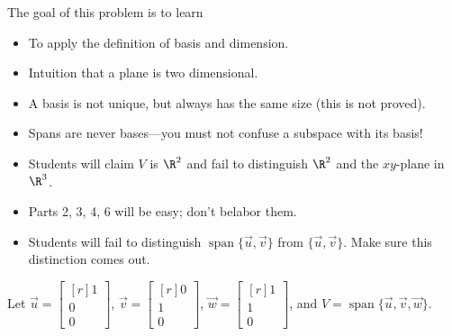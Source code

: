 \documentclass{problemset}
\DeclareMathOperator{\Span}{span}
\newcommand{\mat}[1]{\begin{bmatrix*}[r]#1\end{bmatrix*}}
\begin{document}
	\question
	\begin{annotation}
		\begin{goals}

			The goal of this problem is to learn
			\begin{itemize}
				\item To apply the definition of basis and dimension.
				\item Intuition that a plane is two dimensional.
				\item A basis is not unique, but always has the same size (this is not proved).
				\item Spans are never bases---you must not confuse a subspace with its basis!
			\end{itemize}
		\end{goals}

		\begin{notes}
			\begin{itemize}
				\item Students will claim $V$ is $\R^2$ and fail to distinguish $\R^2$ and the
					$xy$-plane in $\R^3$.
				\item Parts 2, 3, 4, 6 will be easy; don't belabor them.
				\item Students will fail to distinguish $\Span\{\vec u,\vec v\}$ from $\{\vec u,\vec v\}$. Make sure this distinction
					comes out.
			\end{itemize}
		\end{notes}
	\end{annotation}
	Let $\vec u=\mat{1\\0\\0}$, $\vec v=\mat{0\\1\\0}$, $\vec w=\mat{1\\1\\0}$, and $V=\Span\{\vec u,\vec v,\vec w\}$.
\end{document}
